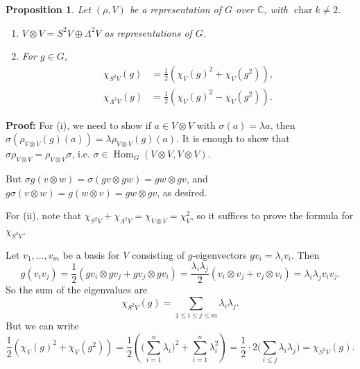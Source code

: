 \documentclass[12pt]{article}
\DeclareMathOperator{\Hom}{Hom}
\DeclareMathOperator{\chr}{char}
\newtheorem{proposition}{Proposition}[section]
\theoremstyle{definition}
\theoremstyle{remark}
\begin{document}
\begin{proposition}
	Let $(\rho, V)$ be a representation of $G$ over $\mathbb{C}$, with $\chr k \neq 2$.
	\begin{enumerate}[\normalfont(i)]
		\item $V \otimes V = S^2 V \oplus \Lambda^2 V$ as representations of $G$.
		\item For $g \in G$,
			\begin{align*}
				\chi_{S^2V}(g) &= \frac{1}{2} (\chi_V(g)^2 + \chi_V(g^2)), \\
				\chi_{\Lambda^2V}(g) &= \frac{1}{2} (\chi_V(g)^2 - \chi_V(g^2)).
			\end{align*}
	\end{enumerate}
\end{proposition}

\begin{adjustbox}{minipage = \columnwidth - 25.5pt, margin=1em, frame=1pt, margin=0em}
	\textbf{Proof:} For (i), we need to show if $a \in V \otimes V$ with $\sigma(a) = \lambda a$, then $\sigma(\rho_{V \otimes V}(g)(a)) = \lambda \rho_{V \otimes V}(g)(a)$. It is enough to show that $\sigma \rho_{V \otimes V} = \rho_{V \otimes V} \sigma$, i.e. $\sigma \in \Hom_G(V \otimes V, V \otimes V)$.

	But $\sigma g(v \otimes w) = \sigma(gv \otimes gw) = gw \otimes gv$, and $g \sigma(v \otimes w) = g(w \otimes v) = gw \otimes gv$, as desired.

	For (ii), note that $\chi_{S^2V} + \chi_{\Lambda^2V} = \chi_{V \otimes V} = \chi_{V}^2$, so it suffices to prove the formula for $\chi_{S^2V}$.

	Let $v_1, \ldots, v_m$ be a basis for $V$ consisting of $g$-eigenvectors $gv_i = \lambda_i v_i$. Then
	\[
		g(v_iv_j) = \frac{1}{2} (gv_i \otimes gv_j + gv_j \otimes gv_i) = \frac{\lambda_i \lambda_j}{2}(v_i \otimes v_j + v_j \otimes v_i) = \lambda_i \lambda_j v_i v_j
	.\]
	So the sum of the eigenvalues are
	\[
		\chi_{S^2V}(g) = \sum_{1 \leq i \leq j \leq m} \lambda_i \lambda_j
	.\]
	But we can write
	\[
		\frac{1}{2} (\chi_V(g)^2 + \chi_V(g^2)) = \frac{1}{2} \left( \Biggl( \sum_{i = 1}^{n} \lambda_i \Biggr)^2 + \sum_{i = 1}^{n} \lambda_i^2 \right) = \frac{1}{2} \cdot 2 \Biggl( \sum_{i \leq j} \lambda_i \lambda_j \Biggr) = \chi_{S^2 V}(g)
	.\]
\end{adjustbox}
\end{document}
